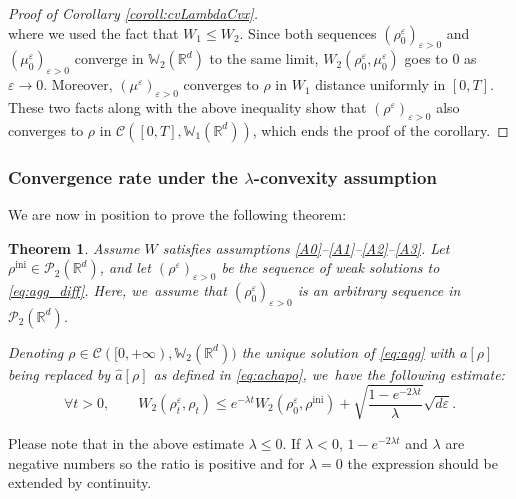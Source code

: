 \documentclass[JEP,XML,SOM,Unicode, NoFloatCountersInSection,published]{cedram}
\newcommand{\ini}{\mathrm{ini}}
\def\RR{\mathbb{R}}
\def\WW{\mathbb{W}}
\def\eps{\varepsilon}
\def\calC{{\mathcal C}}
\def\calP{{\mathcal P}}
\def\achapo{\widehat{a}}
\theoremstyle{plain}
\newtheorem{theorem}{Theorem}[section]
\theoremstyle{definition}
\begin{document}
\begin{proof}[Proof of Corollary \ref{coroll:cvLambdaCvx}]
\[\]
where we used the fact that $W_1 \leq W_2$. Since both sequences $(\rho_0^\eps)_{\eps>0}$ and $(\mu_0^\eps)_{\eps>0}$ converge in $\WW_2(\RR^d)$ to the same limit, $W_2(\rho_0^\eps, \mu_0^\eps)$ goes to 0 as $\eps \to 0$. Moreover, $(\mu^\eps)_{\eps>0}$ converges to $\rho$ in $W_1$ distance uniformly in $[0,T]$. These two facts along with the above inequality show that $(\rho^\eps)_{\eps>0}$ also converges to $\rho$ in $\calC([0,T], \WW_1(\RR^d))$, which ends the proof of the corollary.
\end{proof}

\subsubsection{Convergence rate under the $\lambda$-convexity assumption}

We are now in position to prove the following theorem:
\begin{theorem}\label{thm:cvOrder1/2}
Assume $W$ satisfies assumptions \eqref{A0}--\eqref{A1}--\eqref{A2}--\eqref{A3}. Let $\rho^{\ini} \in \calP_2(\RR^d)$, and let $(\rho^\eps)_{\eps > 0}$ be the sequence of weak solutions to \eqref{eq:agg_diff}. Here, we~assume that $(\rho_0^\eps)_{\eps >0}$ is an arbitrary sequence in $\calP_2(\RR^d)$.

Denoting $\rho \in \calC([0,+\infty), \WW _2(\RR^d))$ the unique solution of \eqref{eq:agg} with $a[\rho]$ being replaced by $\achapo[\rho]$ as defined in \eqref{eq:achapo}, we~have the following estimate:
\begin{equation}\label{ineq:cvgRateLambdaCvx}
\forall t>0, \qquad
W_2(\rho_t^\eps, \rho_t) \leq e^{-\lambda t} W_2(\rho_0^\eps, \rho^{\ini}) + \sqrt{\frac{1 - e^{-2\lambda t}}{\lambda}} \sqrt{d\eps}.
\end{equation}
\end{theorem}
Please note that in the above estimate $\lambda \leq 0$. If $\lambda < 0$, $1 - e^{-2\lambda t}$ and $\lambda$ are negative numbers so the ratio is positive and for $\lambda=0$ the expression should be extended by continuity.
\end{document}
